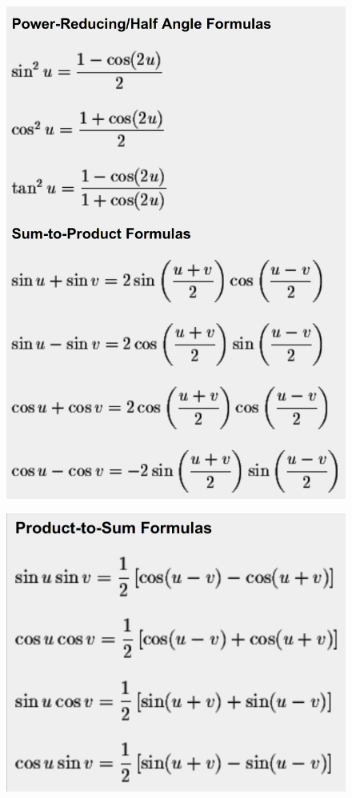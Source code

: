     \begin{figure}[H]
        \centering
        \includegraphics[scale=0.2]{img/trig3.png}
    \end{figure}
    \begin{figure}[H]
        \centering
        \includegraphics[scale=0.2]{img/trig4.png}
    \end{figure}

